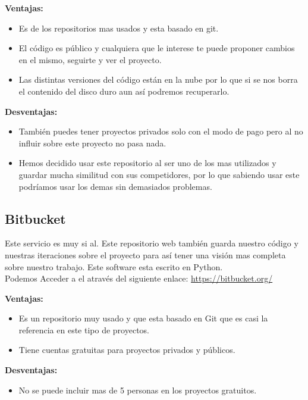 \textbf{Ventajas:}

\begin{itemize}
\item Es de los repositorios mas usados y esta basado en git.

\item El código es público y cualquiera que le interese te puede proponer cambios en el mismo, seguirte y ver el proyecto.

\item Las distintas versiones del código están en la nube por lo que si se nos borra el contenido del disco duro aun así podremos recuperarlo.
\end{itemize}

\textbf{Desventajas:}

\begin{itemize}
\item También puedes tener proyectos privados solo con el modo de pago pero al no influir sobre este proyecto no pasa nada.

\item Hemos decidido usar este repositorio al ser uno de los mas utilizados y guardar mucha similitud con sus competidores, por lo que sabiendo usar este podríamos usar los demas sin demasiados problemas.
\end{itemize}

\subsection{Bitbucket}
Este servicio es muy si
al.
Este repositorio web también guarda nuestro código y nuestras iteraciones sobre el proyecto para así tener una visión mas completa sobre nuestro trabajo.
Este software esta escrito en Python.\\
Podemos Acceder a el através del siguiente enlace: 
\url{https://bitbucket.org/}


\textbf{Ventajas:}
\begin{itemize}

\item Es un repositorio muy usado y que esta basado en Git que es casi la referencia en este tipo de proyectos.

\item Tiene cuentas gratuitas para proyectos privados y públicos.

\end{itemize}

\textbf{Desventajas:}

\begin{itemize}
\item No se puede incluir mas de 5 personas en los proyectos gratuitos.
\end{itemize}





 